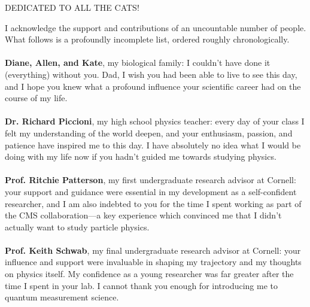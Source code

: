 \documentclass[12pt]{myucthesis}
\begin{document}
\hypersetup{pageanchor=true}
\begin{frontmatter}

\begin{dedication}
\null\vfil
{\large
\begin{center}
DEDICATED TO ALL THE CATS!
\end{center}}
\null\vfil
\end{dedication}

\tableofcontents
\listoffigures %


\begin{acknowledgements}

I acknowledge the support and contributions of an uncountable number of people.  What follows is a profoundly incomplete list, ordered roughly chronologically.
\paragraph{}
\textbf{Diane, Allen, and Kate}, my biological family: I couldn't have done it (everything) without you.  Dad, I wish you had been able to live to see this day, and I hope you knew what a profound influence your scientific career had on the course of my life.
\paragraph{}
\textbf{Dr. Richard Piccioni}, my high school physics teacher: every day of your class I felt my understanding of the world deepen, and your enthusiasm, passion, and patience have inspired me to this day.  I have absolutely no idea what I would be doing with my life now if you hadn't guided me towards studying physics.
\paragraph{}
\textbf{Prof. Ritchie Patterson}, my first undergraduate research advisor at Cornell: your support and guidance were essential in my development as a self-confident researcher, and I am also indebted to you for the time I spent working as part of the CMS collaboration---a key experience which convinced me that I didn't actually want to study particle physics.
\paragraph{}
\textbf{Prof. Keith Schwab}, my final undergraduate research advisor at Cornell: your influence and support were invaluable in shaping my trajectory and my thoughts on physics itself.  My confidence as a young researcher was far greater after the time I spent in your lab.  I cannot thank you enough for introducing me to quantum measurement science.

\end{acknowledgements}
\end{frontmatter}
\end{document}

